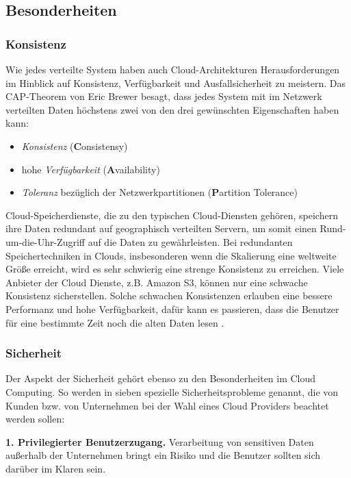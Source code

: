 \subsection{Besonderheiten}
\subsubsection{Konsistenz}
Wie jedes verteilte System haben auch Cloud-Architekturen Herausforderungen im Hinblick auf Konsistenz, Verfügbarkeit und Ausfallsicherheit zu meistern.
Das CAP-Theorem\cite{CAP} von Eric Brewer besagt, dass jedes System mit im Netzwerk verteilten Daten höchstens zwei von den drei gewünschten Eigenschaften haben kann:
\begin{itemize}
	\item \textit{Konsistenz} (\textbf{C}onsistensy)
	\item hohe \textit{Verfügbarkeit} (\textbf{A}vailability)
	\item \textit{Toleranz} bezüglich der Netzwerkpartitionen (\textbf{P}artition Tolerance)
\end{itemize}

Cloud-Speicherdienste, die zu den typischen Cloud-Diensten gehören, speichern ihre Daten redundant auf geographisch verteilten Servern, um somit einen Rund-um-die-Uhr-Zugriff auf die Daten zu gewährleisten.
Bei redundanten Speichertechniken in Clouds, insbesonderen wenn die Skalierung eine weltweite Größe erreicht, wird es sehr schwierig eine strenge Konsistenz zu erreichen. Viele Anbieter der Cloud Dienste, z.B. Amazon S3, können nur eine schwache Konsistenz
sicherstellen. Solche schwachen Konsistenzen erlauben eine bessere Performanz und hohe Verfügbarkeit, dafür kann es passieren, dass die Benutzer für eine bestimmte Zeit noch die alten Daten lesen \cite{consistency-as-a-service}.

\subsubsection{Sicherheit}
Der Aspekt der Sicherheit gehört ebenso zu den Besonderheiten im Cloud Computing. So werden in \cite{seven-seq-risks} sieben spezielle Sicherheitsprobleme genannt, die von Kunden bzw. von Unternehmen bei der Wahl eines Cloud Providers beachtet werden sollen:

\textbf{1. Privilegierter Benutzerzugang.} Verarbeitung von sensitiven Daten außerhalb der Unternehmen bringt ein Risiko und die Benutzer sollten sich darüber im Klaren sein.

